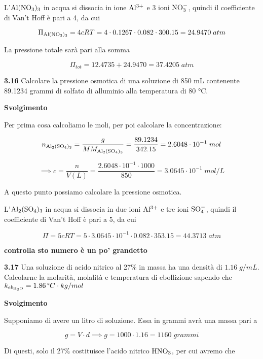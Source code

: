 L'$\rm Al(NO_3)_3$ in acqua si dissocia in ione $\rm Al^{3+}$ e 3 ioni $\rm NO_3^-$, quindi il coefficiente di Van't Hoff è pari a 4, da cui

$$\Pi_{\rm Al(NO_3)_3}=4cRT=4 \cdot 0.1267 \cdot 0.082 \cdot 300.15=24.9470\;atm$$

La pressione totale sarà pari alla somma

$$\Pi_{tot}=12.4735 + 24.9470=37.4205\;atm$$

\vspace{0.2cm}\textbf{3.16} Calcolare la pressione osmotica di una soluzione di 850 mL contenente 89.1234 grammi di solfato di alluminio alla temperatura di 80 °C.

\vspace{0.2cm}\large\textbf{Svolgimento}\normalsize

\vspace{0.2cm}Per prima cosa calcoliamo le moli, per poi calcolare la concentrazione:

$$n_{\rm Al_2(SO_4)_3}=\frac{g}{MM_{\rm Al_2(SO_4)_3}}=\frac{89.1234}{342.15}=2.6048 \cdot 10^{-1}\;mol$$

$$\implies c=\frac{n}{V(L)}=\frac{2.6048 \cdot 10^{-1} \cdot 1000}{850}=3.0645 \cdot 10^{-1}\;mol/L$$

A questo punto possiamo calcolare la pressione osmotica.

L'$\rm Al_2(SO_4)_3$ in acqua si dissocia in due ioni $\rm Al^{3+}$ e tre ioni $\rm SO_4^-$, quindi il coefficiente di Van't Hoff è pari a 5, da cui

$$\Pi=5cRT
=5 \cdot 3.0645 \cdot 10^{-1} \cdot 0.082 \cdot 353.15
=44.3713\;atm$$

\textbf{controlla sto numero è un po' grandetto}

\vspace{0.2cm}\textbf{3.17} Una soluzione di acido nitrico al 27\% in massa ha una densità di $1.16\;g/mL$. Calcolarne la molarità, molalità e temperatura di ebollizione sapendo che $k_{eb_{\rm H_2O}}=1.86\,\text{°}C \cdot kg/mol$

\vspace{0.2cm}\large\textbf{Svolgimento}\normalsize

\vspace{0.2cm}Supponiamo di avere un litro di soluzione. Essa in grammi avrà una massa pari a

$$g=V \cdot d \implies g=1000 \cdot 1.16 = 1160\;grammi$$

Di questi, solo il 27\% costituisce l'acido nitrico $\rm HNO_3$, per cui avremo che

